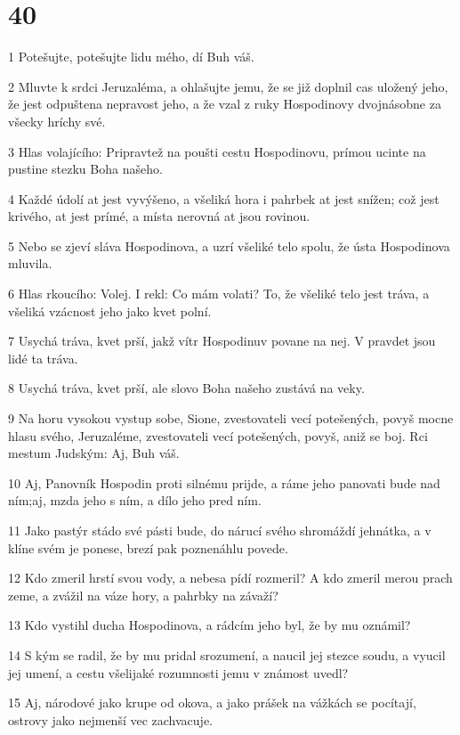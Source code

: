 \chapter{40}

\par 1 Potešujte, potešujte lidu mého, dí Buh váš.
\par 2 Mluvte k srdci Jeruzaléma, a ohlašujte jemu, že se již doplnil cas uložený jeho, že jest odpuštena nepravost jeho, a že vzal z ruky Hospodinovy dvojnásobne za všecky hríchy své.
\par 3 Hlas volajícího: Pripravtež na poušti cestu Hospodinovu, prímou ucinte na pustine stezku Boha našeho.
\par 4 Každé údolí at jest vyvýšeno, a všeliká hora i pahrbek at jest snížen; což jest krivého, at jest prímé, a místa nerovná at jsou rovinou.
\par 5 Nebo se zjeví sláva Hospodinova, a uzrí všeliké telo spolu, že ústa Hospodinova mluvila.
\par 6 Hlas rkoucího: Volej. I rekl: Co mám volati? To, že všeliké telo jest tráva, a všeliká vzácnost jeho jako kvet polní.
\par 7 Usychá tráva, kvet prší, jakž vítr Hospodinuv povane na nej. V pravdet jsou lidé ta tráva.
\par 8 Usychá tráva, kvet prší, ale slovo Boha našeho zustává na veky.
\par 9 Na horu vysokou vystup sobe, Sione, zvestovateli vecí potešených, povyš mocne hlasu svého, Jeruzaléme, zvestovateli vecí potešených, povyš, aniž se boj. Rci mestum Judským: Aj, Buh váš.
\par 10 Aj, Panovník Hospodin proti silnému prijde, a ráme jeho panovati bude nad ním;aj, mzda jeho s ním, a dílo jeho pred ním.
\par 11 Jako pastýr stádo své pásti bude, do nárucí svého shromáždí jehnátka, a v klíne svém je ponese, brezí pak poznenáhlu povede.
\par 12 Kdo zmeril hrstí svou vody, a nebesa pídí rozmeril? A kdo zmeril merou prach zeme, a zvážil na váze hory, a pahrbky na závaží?
\par 13 Kdo vystihl ducha Hospodinova, a rádcím jeho byl, že by mu oznámil?
\par 14 S kým se radil, že by mu pridal srozumení, a naucil jej stezce soudu, a vyucil jej umení, a cestu všelijaké rozumnosti jemu v známost uvedl?
\par 15 Aj, národové jako krupe od okova, a jako prášek na vážkách se pocítají, ostrovy jako nejmenší vec zachvacuje.
